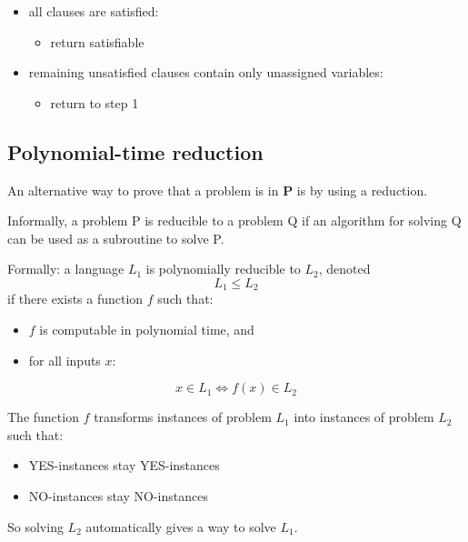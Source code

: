 \documentclass[11pt]{article}
\providecommand{\tightlist}{%
      \setlength{\itemsep}{0pt}\setlength{\parskip}{0pt}}
\begin{document}
\begin{enumerate}
  \begin{itemize}
  \tightlist
  \item
    all clauses are satisfied:

    \begin{itemize}
    \tightlist
    \item
      return satisfiable
    \end{itemize}
  \item
    remaining unsatisfied clauses contain only unassigned variables:

    \begin{itemize}
    \tightlist
    \item
      return to step 1
    \end{itemize}
  \end{itemize}
\end{enumerate}

    \subsection{Polynomial-time reduction}\label{polynomial-time-reduction}

An alternative way to prove that a problem is in \textbf{P} is by using
a reduction.

Informally, a problem P is reducible to a problem Q if an algorithm for
solving Q can be used as a subroutine to solve P.

Formally: a language \(L_1\) is polynomially reducible to \(L_2\),
denoted \[ L_1 \leq L_2 \] if there exists a function \(f\) such that:

\begin{itemize}
\tightlist
\item
  \(f\) is computable in polynomial time, and
\item
  for all inputs \(x\):
\end{itemize}

\[x \in L_1 \iff f(x) \in L_2\]

The function \(f\) transforms instances of problem \(L_1\) into
instances of problem \(L_2\) such that:

\begin{itemize}
\tightlist
\item
  YES-instances stay YES-instances
\item
  NO-instances stay NO-instances
\end{itemize}

So solving \(L_2\) automatically gives a way to solve \(L_1\).
\end{document}
